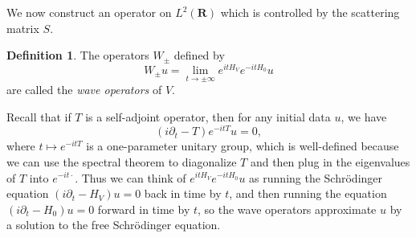 \documentclass[12pt]{report}
\newcommand{\RR}{\mathbf{R}}
\newcommand{\dfn}[1]{\emph{#1}\index{#1}}
\theoremstyle{definition}
\newtheorem{definition}[theorem]{Definition}
\begin{document}
We now construct an operator on $L^2(\RR)$ which is controlled by the scattering matrix $S$.

\begin{definition}
The operators $W_\pm$ defined by
$$W_\pm u = \lim_{t \to \pm \infty} e^{itH_V} e^{-itH_0} u$$
are called the \dfn{wave operators} of $V$.
\end{definition}
Recall that if $T$ is a self-adjoint operator, then for any initial data $u$, we have
$$(i\partial_t - T)e^{-itT}u = 0,$$
where $t \mapsto e^{-itT}$ is a one-parameter unitary group, which is well-defined because we can use the spectral theorem to diagonalize $T$ and then plug in the eigenvalues of $T$ into $e^{-it\cdot}$. Thus we can think of $e^{itH_V}e^{-itH_0} u$ as running the Schrödinger equation $(i\partial_t - H_V)u = 0$ back in time by $t$, and then running the equation $(i\partial_t - H_0)u = 0$ forward in time by $t$, so the wave operators approximate $u$ by a solution to the free Schrödinger equation.
\end{document}
